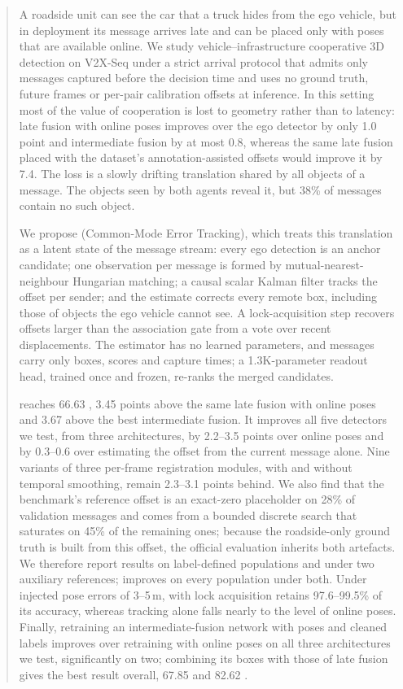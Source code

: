 \begin{abstract}
A roadside unit can see the car that a truck hides from the ego vehicle, but in deployment its message arrives late and can be placed only with poses that are available online.
We study vehicle--infrastructure cooperative 3D detection on V2X-Seq under a strict arrival protocol that admits only messages captured before the decision time and uses no ground truth, future frames or per-pair calibration offsets at inference.
In this setting most of the value of cooperation is lost to geometry rather than to latency: late fusion with online poses improves \apseven over the ego detector by only 1.0 point and intermediate fusion by at most 0.8, whereas the same late fusion placed with the dataset's annotation-assisted offsets would improve it by 7.4.
The loss is a slowly drifting translation shared by all objects of a message. The objects seen by both agents reveal it, but 38\% of messages contain no such object.

We propose \method (Common-Mode Error Tracking), which treats this translation as a latent state of the message stream: every ego detection is an anchor candidate; one observation per message is formed by mutual-nearest-neighbour Hungarian matching; a causal scalar Kalman filter tracks the offset per sender; and the estimate corrects every remote box, including those of objects the ego vehicle cannot see.
A lock-acquisition step recovers offsets larger than the association gate from a vote over recent displacements.
The estimator has no learned parameters, and messages carry only boxes, scores and capture times; a 1.3K-parameter readout head, trained once and frozen, re-ranks the merged candidates.

\method reaches 66.63 \apseven, 3.45 points above the same late fusion with online poses and 3.67 above the best intermediate fusion.
It improves all five detectors we test, from three architectures, by 2.2--3.5 points over online poses and by 0.3--0.6 over estimating the offset from the current message alone.
Nine variants of three per-frame registration modules, with and without temporal smoothing, remain 2.3--3.1 points behind.
We also find that the benchmark's reference offset is an exact-zero placeholder on 28\% of validation messages and comes from a bounded discrete search that saturates on 45\% of the remaining ones; because the roadside-only ground truth is built from this offset, the official evaluation inherits both artefacts.
We therefore report results on label-defined populations and under two auxiliary references; \method improves on every population under both.
Under injected pose errors of 3--5\,m, \method with lock acquisition retains 97.6--99.5\% of its accuracy, whereas tracking alone falls nearly to the level of online poses.
Finally, retraining an intermediate-fusion network with \method poses and cleaned labels improves over retraining with online poses on all three architectures we test, significantly on two; combining its boxes with those of \method late fusion gives the best result overall, 67.85 \apseven and 82.62 \apfive.
\end{abstract}
